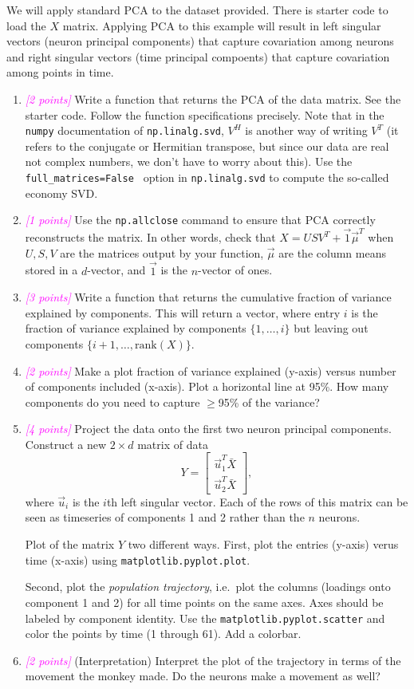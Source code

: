 \documentclass{article}
\newcommand{\points}[1]{\small\textcolor{magenta}{\emph{[#1 points]}} \normalsize}
\begin{document}
\vspace{1em}
We will apply standard PCA to the dataset provided. There is starter code to load the $X$ matrix.
Applying PCA to this example will result in left singular vectors (neuron principal components)
that capture covariation among neurons and right singular vectors (time principal compoents)
that capture covariation among points in time.
\begin{enumerate}
\item \points{2} Write a function that returns the PCA of the data matrix. See the starter code.
  Follow the function specifications precisely.
  Note that in the {\tt numpy} documentation of {\tt np.linalg.svd}, 
  $V^H$ is another way of writing $V^T$ 
  (it refers to the conjugate or Hermitian transpose, 
  but since our data are real not complex numbers,
  we don't have to worry about this).
  Use the {\tt full\_matrices=False } option in {\tt np.linalg.svd} to compute the so-called economy SVD.
\item \points{1} Use the {\tt np.allclose} command to ensure that PCA correctly reconstructs the matrix.
  In other words, check that $X = U S V^T + \vec 1 \vec\mu^T$ when $U, S, V$ 
  are the matrices output by your function,
  $\vec \mu$ are the column means stored in a $d$-vector, and $\vec 1$ is the $n$-vector of ones.
\item \points{3}
  Write a function that returns the cumulative fraction of variance explained by components.
  This will return a vector, where entry $i$ is the fraction of variance explained
  by components $\{1, \ldots, i\}$ but leaving out components $\{i+1, \ldots, \mathrm{rank}(X)\}$.
\item \points{2}
  Make a plot fraction of variance explained (y-axis) versus number of components included (x-axis).
  Plot a horizontal line at 95\%. How many components do you need to capture $\geq$95\% of the variance?
\item \points{4}
  Project the data onto the first two neuron principal components.
  Construct a new $2 \times d$ matrix of data 
  $$
  Y = \begin{bmatrix} \vec u_1^T  \bar X \\ \vec u_2^T \bar X \end{bmatrix},
  $$
  where $\vec u_i$ is the $i$th left singular vector.
  Each of the rows of this matrix can be seen as timeseries of components 1 and 2
  rather than the $n$ neurons.
  
  Plot of the matrix $Y$ two different ways. 
  First, plot the entries (y-axis) verus time (x-axis) 
  using {\tt matplotlib.pyplot.plot}.
  
  Second, plot the {\em population trajectory}, i.e.\ plot the columns (loadings onto component 1 and 2)
  for all time points on the same axes.
  Axes should be labeled by component identity.
  Use the {\tt matplotlib.pyplot.scatter} and color the points by time (1 through 61). 
  Add a colorbar.
  \item \points{2} (Interpretation)
    Interpret the plot of the trajectory in terms of the movement the monkey made.
    Do the neurons make a movement as well?
\end{enumerate}
\end{document}
